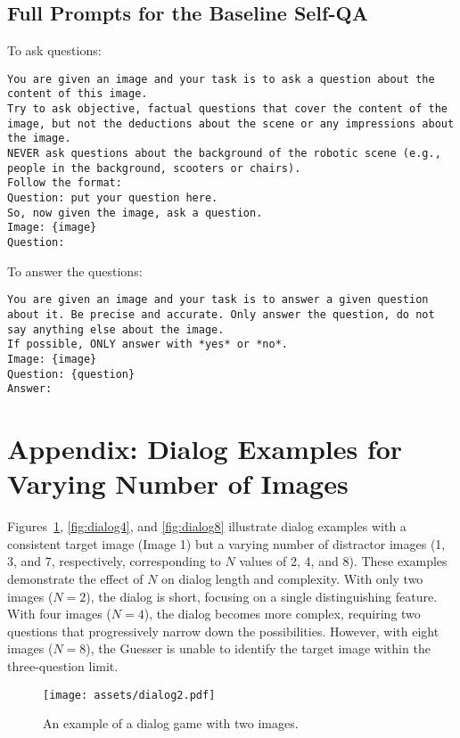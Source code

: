 \subsection{Full Prompts for the Baseline Self-QA}
\label{qa-prompts}

To ask questions:

\begin{lstlisting}
You are given an image and your task is to ask a question about the content of this image.
Try to ask objective, factual questions that cover the content of the image, but not the deductions about the scene or any impressions about the image.
NEVER ask questions about the background of the robotic scene (e.g., people in the background, scooters or chairs).
Follow the format:
Question: put your question here.
So, now given the image, ask a question.
Image: {image}
Question:
\end{lstlisting}

To answer the questions:
\begin{lstlisting}
You are given an image and your task is to answer a given question about it. Be precise and accurate. Only answer the question, do not say anything else about the image.
If possible, ONLY answer with *yes* or *no*.
Image: {image}
Question: {question}
Answer:
\end{lstlisting}

\section{Appendix: Dialog Examples for Varying Number of Images}
\label{game-examples-n}

Figures~\ref{fig:dialog2}, \ref{fig:dialog4}, and \ref{fig:dialog8} illustrate dialog examples with a consistent target image (Image 1) but a varying number of distractor images (1, 3, and 7, respectively, corresponding to $N$ values of 2, 4, and 8).
These examples demonstrate the effect of $N$ on dialog length and complexity.
With only two images ($N=2$), the dialog is short, focusing on a single distinguishing feature.
With four images ($N=4$), the dialog becomes more complex, requiring two questions that progressively narrow down the possibilities.
However, with eight images ($N=8$), the Guesser is unable to identify the target image within the three-question limit. 
\begin{figure}[t]
    \centering
    \texttt{[image: assets/dialog2.pdf]}
    \caption{An example of a dialog game with two images.}
    \label{fig:dialog2}
\end{figure}

